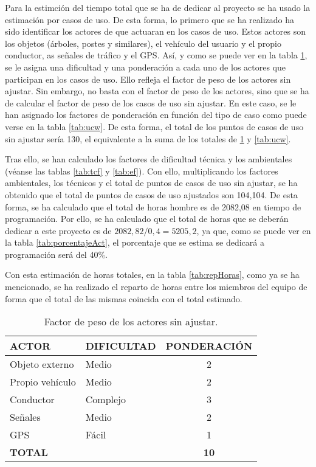 Para la estimción del tiempo total que se ha de dedicar al proyecto se ha usado la estimación por casos de uso. De esta forma, lo primero que se ha realizado ha sido identificar los actores de que actuaran en los casos de uso. Estos actores son los objetos (árboles, postes y similares), el vehículo del usuario y el propio conductor, as señales de tráfico y el GPS. Así, y como se puede ver en la tabla \ref{tab:uaw}, se le asigna una dificultad y una ponderación a cada uno de los actores que participan en los casos de uso. Ello refleja el factor de peso de los actores sin ajustar. Sin embargo, no basta con el factor de peso de los actores, sino que se ha de calcular el factor de peso de los casos de uso sin ajustar. En este caso, se le han asignado los factores de ponderación en función del tipo de caso como puede verse en la tabla \ref{tab:ucw}. De esta forma, el total de los puntos de casos de uso sin ajustar sería 130, el equivalente a la suma de los totales de \ref{tab:uaw} y \ref{tab:ucw}.
\par Tras ello, se han calculado los factores de dificultad técnica y los ambientales (véanse las tablas \ref{tab:tcf} y \ref{tab:ef}). Con ello, multiplicando los factores ambientales, los técnicos y el total de puntos de casos de uso sin ajustar, se ha obtenido que el total de puntos de casos de uso ajustados son 104,104. De esta forma, se ha calculado que el total de horas hombre es de 2082,08 en tiempo de programación. Por ello, se ha calculado que el total de horas que se deberán dedicar a este proyecto es de $2082,82/0,4=5205,2$, ya que, como se puede ver en la tabla \ref{tab:porcentajeAct}, el porcentaje que se estima se dedicará a programación será del 40\%.
\par Con esta estimación de horas totales, en la tabla \ref{tab:repHoras}, como ya se ha mencionado, se ha realizado el reparto de horas entre los miembros del equipo de forma que el total de las mismas coincida con el total estimado.

\begin{table}[!hb]
\begin{center}
\begin{tabular}{l l c}
\textbf{ACTOR} & \textbf{DIFICULTAD} & \textbf{PONDERACIÓN}\\ \hline \hline
Objeto externo & Medio & 2  \\
Propio vehículo & Medio & 2\\
Conductor & Complejo & 3\\
Señales & Medio & 2\\
GPS & Fácil & 1\\ \hline
\textbf{TOTAL} &  & \textbf{10}\\ \hline \hline
\end{tabular}
\caption{Factor de peso de los actores sin ajustar.}
\label{tab:uaw}
\end{center}
\end{table}


